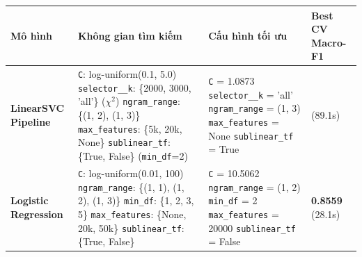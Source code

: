 \begin{table}[H]
\centering
\small
\renewcommand{\arraystretch}{1.2}
\setlength{\tabcolsep}{5pt}
\begin{tabularx}{\textwidth}{|>{\raggedright\arraybackslash}p{2.3cm}|>{\raggedright\arraybackslash}X|>{\raggedright\arraybackslash}p{4.3cm}|>{\centering\arraybackslash}p{2.2cm}|}
\hline
\textbf{Mô hình} & \textbf{Không gian tìm kiếm} & \textbf{Cấu hình tối ưu} & \textbf{Best CV Macro-F1} \\ \hline
\textbf{LinearSVC} \newline \textbf{Pipeline} &
\texttt{C}: log-uniform(0.1, 5.0) \newline
\texttt{selector\_\_k}: \{2000, 3000, 'all'\} ($\chi^2$) \newline
\texttt{ngram\_range}: \{(1, 2), (1, 3)\} \newline
\texttt{max\_features}: \{5k, 20k, None\} \newline
\texttt{sublinear\_tf}: \{True, False\} (\texttt{min\_df}=2) &
\texttt{C} = 1.0873 \newline
\texttt{selector\_\_k} = 'all' \newline
\texttt{ngram\_range} = (1, 3) \newline
\texttt{max\_features} = None \newline
\texttt{sublinear\_tf} = True &
0.8538 \newline (89.1s) \\ \hline

\textbf{Logistic} \newline \textbf{Regression} &
\texttt{C}: log-uniform(0.01, 100) \newline
\texttt{ngram\_range}: \{(1, 1), (1, 2), (1, 3)\} \newline
\texttt{min\_df}: \{1, 2, 3, 5\} \newline
\texttt{max\_features}: \{None, 20k, 50k\} \newline
\texttt{sublinear\_tf}: \{True, False\} &
\texttt{C} = 10.5062 \newline
\texttt{ngram\_range} = (1, 2) \newline
\texttt{min\_df} = 2 \newline
\texttt{max\_features} = 20000 \newline
\texttt{sublinear\_tf} = False &
\textbf{0.8559} \newline (28.1s) \\ \hline


\end{tabularx}
\end{table}
